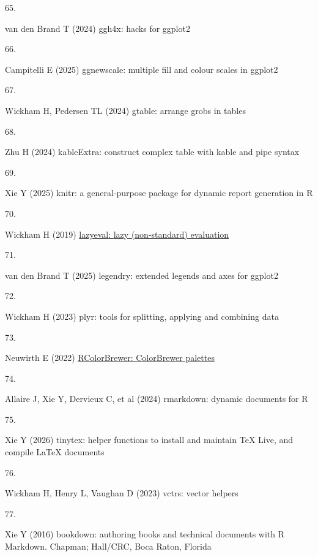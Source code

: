 \documentclass[
  12 pt,
]{article}
\newlength{\cslhangindent}
\newlength{\csllabelwidth}
\newenvironment{CSLReferences}[2] %
 {\begin{list}{}{%
  \setlength{\itemindent}{0pt}
  \setlength{\leftmargin}{0pt}
  \setlength{\parsep}{0pt}
  \ifodd #1
   \setlength{\leftmargin}{\cslhangindent}
   \setlength{\itemindent}{-1\cslhangindent}
  \fi
  \setlength{\itemsep}{#2\baselineskip}}}
 {\end{list}}
\newcommand{\CSLLeftMargin}[1]{\parbox[t]{\csllabelwidth}{\strut#1\strut}}
\newcommand{\CSLRightInline}[1]{\parbox[t]{\linewidth - \csllabelwidth}{\strut#1\strut}}
\begin{document}
\begin{CSLReferences}{0}{0}
\CSLLeftMargin{65. }%
\CSLRightInline{van den Brand T (2024) ggh4x: {hacks} for ggplot2}

\CSLLeftMargin{66. }%
\CSLRightInline{Campitelli E (2025) {ggnewscale}: {multiple} fill and colour scales in ggplot2}

\CSLLeftMargin{67. }%
\CSLRightInline{Wickham H, Pedersen TL (2024) {gtable}: {arrange} grobs in tables}

\CSLLeftMargin{68. }%
\CSLRightInline{Zhu H (2024) kableExtra: {construct} complex table with kable and pipe syntax}

\CSLLeftMargin{69. }%
\CSLRightInline{Xie Y (2025) {knitr}: {a} general-purpose package for dynamic report generation in {R}}

\CSLLeftMargin{70. }%
\CSLRightInline{Wickham H (2019) \href{https://doi.org/10.32614/CRAN.package.lazyeval}{{lazyeval}: {lazy} (non-standard) evaluation}}

\CSLLeftMargin{71. }%
\CSLRightInline{van den Brand T (2025) {legendry}: {extended} legends and axes for ggplot2}

\CSLLeftMargin{72. }%
\CSLRightInline{Wickham H (2023) {plyr}: {tools} for splitting, applying and combining data}

\CSLLeftMargin{73. }%
\CSLRightInline{Neuwirth E (2022) \href{https://doi.org/10.32614/CRAN.package.RColorBrewer}{RColorBrewer: {ColorBrewer} palettes}}

\CSLLeftMargin{74. }%
\CSLRightInline{Allaire J, Xie Y, Dervieux C, et al (2024) {rmarkdown}: {dynamic} documents for {R}}

\CSLLeftMargin{75. }%
\CSLRightInline{Xie Y (2026) {tinytex}: {helper} functions to install and maintain {TeX Live}, and compile LaTeX documents}

\CSLLeftMargin{76. }%
\CSLRightInline{Wickham H, Henry L, Vaughan D (2023) {vctrs}: {vector} helpers}

\CSLLeftMargin{77. }%
\CSLRightInline{Xie Y (2016) {bookdown}: {authoring} books and technical documents with {R} {Markdown}. Chapman; Hall/CRC, Boca Raton, Florida}


\end{CSLReferences}
\end{document}
